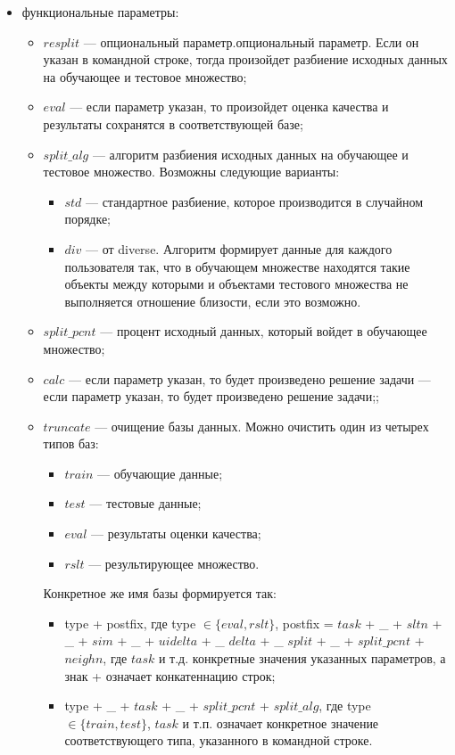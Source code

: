 \begin{itemize}
\begin{itemize}
	\end{itemize}
	\item функциональные параметры:
		\begin{itemize}
			\item $resplit$ --- опциональный параметр.опциональный параметр.
				Если он указан в командной строке, тогда произойдет разбиение
				исходных данных на обучающее и тестовое множество;
			\item $eval$ --- если параметр указан, то произойдет оценка
				качества и результаты сохранятся в соответствующей базе;
			\item $split\_alg$ --- алгоритм разбиения исходных данных на
				обучающее и тестовое множество. Возможны следующие варианты:
				\begin{itemize}
					\item $std$ --- стандартное разбиение, которое производится
						в случайном порядке;
					\item $div$ --- от diverse. Алгоритм формирует данные для
						каждого пользователя так,
						что в обучающем множестве находятся такие объекты между
						которыми и объектами тестового множества не выполняется
						отношение близости, если это возможно.
				\end{itemize}
			\item $split\_pcnt$ --- процент исходный данных, который войдет в
				обучающее множество;
			\item $calc$ --- если параметр указан, то будет произведено решение
				задачи --- если параметр указан, то будет произведено решение
				задачи;;
			\item $truncate$ --- очищение базы данных. Можно очистить один из
				четырех типов баз:
				\begin{itemize}
					\item $train$ --- обучающие данные;
					\item $test$ --- тестовые данные;
					\item $eval$ --- результаты оценки качества;
					\item $rslt$ --- результирующее множество.
				\end{itemize}
				Конкретное же имя базы формируется так:
				\begin{itemize}
					\item type + postfix, где type $\in \{eval, rslt\}$, postfix
						=
					$task$ + \_ + $sltn$ + \_ + $sim$ + \_ + $uidelta$ + \_ $delta$ +
					\_ $split$ + \_ + $split\_pcnt$ + $neighn$, где $task$ и
						т.д. конкретные значения указанных параметров, а знак +
						означает конкатеннацию строк;
					\item type + \_ + $task$ + \_ + $split\_pcnt$ +
						$split\_alg$,
						где type $\in \{train, test\}$, $task$ и т.п.
						означает конкретное значение соответствующего типа, указанного в
						командной строке.
				\end{itemize}

		\end{itemize}
\end{itemize}

